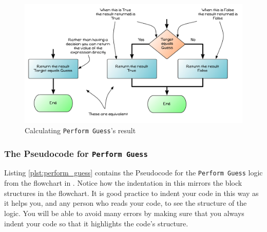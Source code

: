 \begin{figure}[htbp]
   \centering
   \includegraphics[width=\textwidth]{./topics/control-flow/diagrams/PerformGuess6} 
   \caption{Calculating \texttt{Perform Guess}'s result}
   \label{fig:perform-guess-seq-6}
\end{figure}






\clearpage
\subsubsection{The Pseudocode for \texttt{Perform Guess}} %
\label{ssub:the_pseudocode_for_perform_guess}

Listing \ref{plst:perform_guess} contains the Pseudocode for the \texttt{Perform Guess} logic from the flowchart in . Notice how the indentation in this mirrors the block structures in the flowchart. It is good practice to indent your code in this way as it helps you, and any person who reads your code, to see the structure of the logic. You will be able to avoid many errors by making sure that you always indent your code so that it highlights the code's structure.

